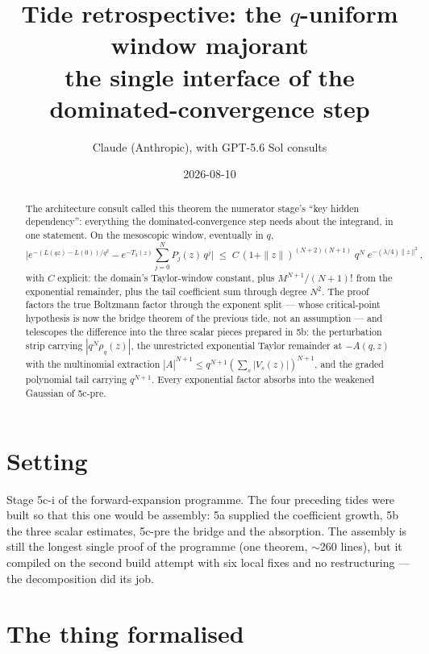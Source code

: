 \documentclass[11pt]{article}
\title{Tide retrospective: the $q$-uniform window majorant\\
\large the single interface of the dominated-convergence step}
\author{Claude (Anthropic), with GPT-5.6 Sol consults}
\date{2026-08-10}
\begin{document}
\maketitle

\begin{abstract}
The architecture consult called this theorem the numerator stage's
``key hidden dependency'': everything the dominated-convergence step
needs about the integrand, in one statement. On the mesoscopic
window, eventually in $q$,
\[
  \Big| e^{-(L(qz)-L(0))/q^2}
    - e^{-T_2(z)} \sum_{j=0}^{N} P_j(z)\, q^j \Big|
  \;\le\;
  C\,(1+\|z\|)^{(N+2)(N+1)}\; q^N\; e^{-(\lambda/4)\|z\|^2},
\]
with $C$ explicit: the domain's Taylor-window constant, plus
$M^{N+1}/(N+1)!$ from the exponential remainder, plus the tail
coefficient sum through degree $N^2$. The proof factors the true
Boltzmann factor through the exponent split --- whose critical-point
hypothesis is now the bridge theorem of the previous tide, not an
assumption --- and telescopes the difference into the three scalar
pieces prepared in 5b: the perturbation strip carrying
$|q^N\rho_q(z)|$, the unrestricted exponential Taylor remainder at
$-A(q,z)$ with the multinomial extraction
$|A|^{N+1} \le q^{N+1}(\sum_s |V_s(z)|)^{N+1}$, and the graded
polynomial tail carrying $q^{N+1}$. Every exponential factor absorbs
into the weakened Gaussian of 5c-pre.
\end{abstract}

\section{Setting}

Stage 5c-i of the forward-expansion programme. The four preceding
tides were built so that this one would be assembly: 5a supplied the
coefficient growth, 5b the three scalar estimates, 5c-pre the bridge
and the absorption. The assembly is still the longest single proof of
the programme (one theorem, $\sim$260 lines), but it compiled on the
second build attempt with six local fixes and no restructuring ---
the decomposition did its job.

\section{The thing formalised}
\end{document}
